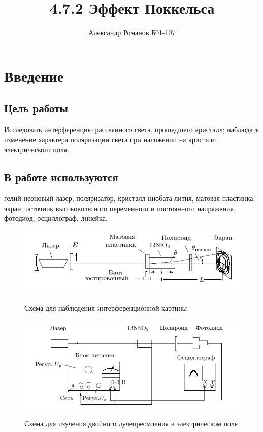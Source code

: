 \documentclass{article}
\author{Александр Романов Б01-107}
\date{}
\title{4.7.2 Эффект Поккельса}
\begin{document}
\maketitle
\section{Введение}
\subsection{Цель работы}
Исследовать интерференцию рассеянного света, прошедшего кристалл; наблюдать изменение характера поляризации
света при наложении на кристалл электрического поля.
\subsection{В работе используются}
гелий-неоновый лазер, поляризатор, кристалл ниобата лития, матовая пластинка, экран, источник высоковольтного
переменного и постоянного напряжения, фотодиод, осциллограф, линейка.

\begin{figure}[H]
  \centering
  \includegraphics[width=\textwidth]{scheme.png}\label{fig:scheme1}
  \caption{Схема для наблюдения интерференционной картины}
\end{figure}

\begin{figure}[H]
  \centering
  \includegraphics[width=\textwidth]{scheme-2.png}\label{fig:scheme2}
  \caption{Схема для изучения двойного лучепреомления в электрическом поле}
\end{figure}
\end{document}
